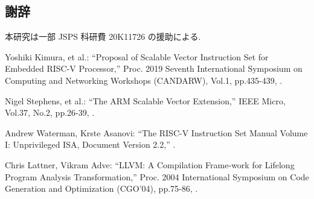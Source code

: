 \documentclass[a4paper,9pt, twocolumn]{jarticle}
\renewcommand{\baselinestretch}{0.87}   %
\begin{document}
\renewcommand{\baselinestretch}{0.83}\selectfont
\subsection*{\small 謝辞}
\vspace{-0.5mm}
{\small 本研究は一部 JSPS 科研費 20K11726 の援助による.}


%
%
\begin{thebibliography}{9}
\itemsep -1.7pt

{\small Yoshiki Kimura, et al.:      %
\newblock ``Proposal of Scalable Vector Instruction Set for Embedded RISC-V Processor,''
\newblock Proc. 2019 Seventh International Symposium on Computing and Networking Workshops (CANDARW),
\newblock Vol.1,
\newblock pp.435-439,
.}

{\small Nigel Stephens, et al.:      %
\newblock ``The ARM Scalable Vector Extension,''
\newblock IEEE Micro,
\newblock Vol.37,
\newblock No.2,
\newblock pp.26-39,
.}

{\small Andrew Waterman, Krste Asanovi:      %
\newblock ``The RISC-V Instruction Set Manual Volume I: Unprivileged ISA, Document Version 2.2,''
.}

{\small Chris Lattner, Vikram Adve:      %
\newblock ``LLVM: A Compilation Frame-work for Lifelong Program Analysis Transformation,''
\newblock Proc. 2004 International Symposium on Code Generation and Optimization (CGO’04),
\newblock pp.75-86,
.}

\end{thebibliography}
\end{document}

